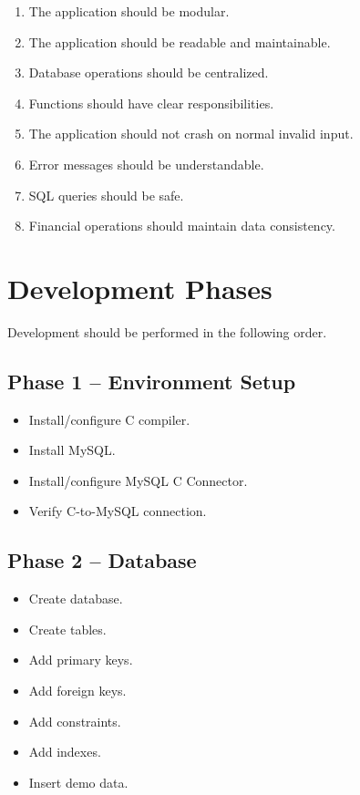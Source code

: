 \documentclass[12pt,a4paper]{article}
\begin{document}
\begin{enumerate}
    \item The application should be modular.
    \item The application should be readable and maintainable.
    \item Database operations should be centralized.
    \item Functions should have clear responsibilities.
    \item The application should not crash on normal invalid input.
    \item Error messages should be understandable.
    \item SQL queries should be safe.
    \item Financial operations should maintain data consistency.
\end{enumerate}


\section{Development Phases}

Development should be performed in the following order.

\subsection{Phase 1 -- Environment Setup}

\begin{itemize}
    \item Install/configure C compiler.
    \item Install MySQL.
    \item Install/configure MySQL C Connector.
    \item Verify C-to-MySQL connection.
\end{itemize}

\subsection{Phase 2 -- Database}

\begin{itemize}
    \item Create database.
    \item Create tables.
    \item Add primary keys.
    \item Add foreign keys.
    \item Add constraints.
    \item Add indexes.
    \item Insert demo data.
\end{itemize}
\end{document}
